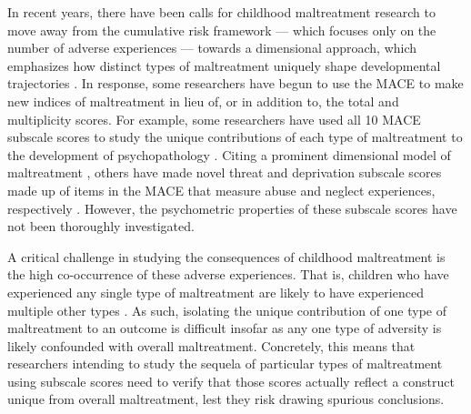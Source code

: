 \documentclass[letterpaper,man,natbib,noextraspace,floatsintext,longtable,12pt]{apa6}
\begin{document}
In recent years, there have been calls for childhood maltreatment research to move away from the cumulative risk framework \citep{evans2013cumulative} --- which focuses only on the number of adverse experiences --- towards a dimensional approach, which emphasizes how distinct types of maltreatment uniquely shape developmental trajectories \citep{mclaughlin2016beyond, belsky2012beyond}. In response, some researchers have begun to use the MACE to make new indices of maltreatment in lieu of, or in addition to, the total and multiplicity scores. For example, some researchers have used all 10 MACE subscale scores to study the unique contributions of each type of maltreatment to the development of psychopathology \citep{schalinski2015type, gerke2018childhood, schalinski2019early}. Citing a prominent dimensional model of maltreatment \citep{mclaughlin2014childhood}, others have made novel threat and deprivation subscale scores made up of items in the MACE that measure abuse and neglect experiences, respectively \citep{schalinski2018defining, schalinski2019environmental, teicher2018differential}. However, the psychometric properties of these subscale scores have not been thoroughly investigated.   

A critical challenge in studying the consequences of childhood maltreatment is the high co-occurrence of these adverse experiences. That is, children who have experienced any single type of maltreatment are likely to have experienced multiple other types \citep{dong2004interrelatedness, herrenkohl2009assessing, kessler2010childhood}. As such, isolating the unique contribution of one type of maltreatment to an outcome is difficult insofar as any one type of adversity is likely confounded with overall maltreatment. Concretely, this means that researchers intending to study the sequela of particular types of maltreatment using subscale scores need to verify that those scores actually reflect a construct unique from overall maltreatment, lest they risk drawing spurious conclusions.
\end{document}
